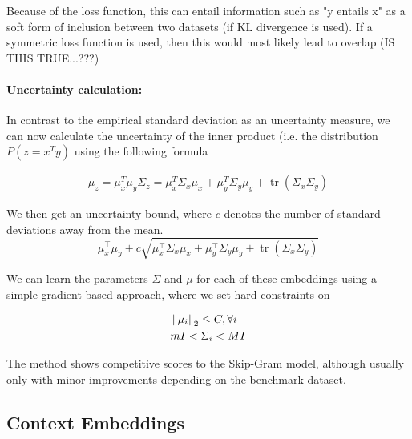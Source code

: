 \documentclass[a4paper,12pt,twoside,openright]{report}
\begin{document}
Because of the loss function, this can entail information such as "y entails x" as a soft form of inclusion between two datasets (if KL divergence is used).
If a symmetric loss function is used, then this would most likely lead to overlap (IS THIS TRUE...???)


\paragraph{Uncertainty calculation:} In contrast to the empirical standard deviation as an uncertainty measure, we can now calculate the uncertainty of the inner product (i.e. the distribution $P(z=x^T y)$ using the following formula

\begin{align}
\mu_z = \mu_x^T \mu_y
\Sigma_z = \mu_{x}^T \Sigma_{x} \mu_{x}+\mu_{y}^T \Sigma_{y} \mu_{y}+\operatorname{tr}\left(\Sigma_{x} \Sigma_{y}\right)
\end{align}

We then get an uncertainty bound, where $c$ denotes the number of standard deviations away from the mean.
\begin{equation}
\mu_{x}^{\top} \mu_{y} \pm c \sqrt{\mu_{x}^{\top} \Sigma_{x} \mu_{x}+\mu_{y}^{\top} \Sigma_{y} \mu_{y}+\operatorname{tr}\left(\Sigma_{x} \Sigma_{y}\right)}
\end{equation}

We can learn the parameters $\Sigma$ and $\mu$ for each of these embeddings using a simple gradient-based approach, where we set hard constraints on 

\begin{align}
& \left\lVert \mu_i \right\rVert_2  \leq C, \forall i \\
& m I <  \Sigma_i < M I
\end{align}

The method shows competitive scores to the Skip-Gram model, although usually only with minor improvements depending on the benchmark-dataset.



\newpage
\subsection{Context Embeddings}
\end{document}
